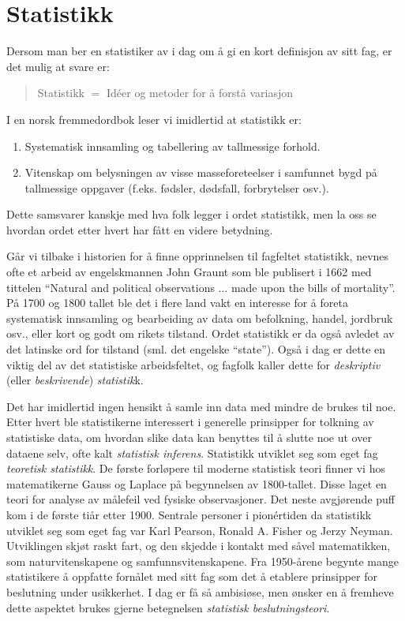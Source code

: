 \section{Statistikk}

Dersom man ber en statistiker av i dag om å gi en kort definisjon
av sitt fag, er det mulig at svare er:

\begin{quote}
Statistikk $=$ Id\'{e}er og metoder for å forstå variasjon
\end{quote}

\noindent I en norsk fremmedordbok leser vi imidlertid at
statistikk er:

\begin{enumerate}
\item Systematisk innsamling og tabellering av tallmessige forhold.
\item Vitenskap om belysningen av visse masseforeteelser i
     samfunnet bygd på tallmessige oppgaver (f.eks. fødsler,
     dødsfall, forbrytelser osv.).
\end{enumerate}

\noindent Dette samsvarer kanskje med hva folk legger i ordet
statistikk, men la oss se hvordan ordet etter hvert har fått en
 videre betydning.
                                 
Går vi tilbake i historien for å finne opprinnelsen til fagfeltet
statistikk, nevnes ofte et arbeid av engelskmannen John Graunt
som ble publisert i 1662 med tittelen ``Natural and political
observations ... made upon the bills of mortality''.  På 1700 og
1800 tallet ble det i flere land vakt en interesse for å foreta
systematisk innsamling og bearbeiding av data om befolkning,
handel, jordbruk osv., eller kort og godt om rikets tilstand. 
Ordet statistikk er da også avledet av det latinske ord for
tilstand (sml. det engelske ``state'').  Også i dag er dette en
viktig del av det statistiske arbeids\-feltet, og fagfolk kaller
dette for {\em deskriptiv} (eller {\em beskrivende}) {\em statistik}k.

Det har imidlertid ingen hensikt å samle inn data med mindre de
brukes til noe.  Etter hvert ble statistikerne interessert i
generelle prinsipper for tolkning av statistiske data, om hvordan
slike data kan benyttes til å slutte noe ut over dataene selv, 
ofte kalt {\em statistisk inferens}. 
Statistikk utviklet seg som eget fag {\em teoretisk statistikk}. 
De første forløpere til
moderne statistisk teori finner vi hos matematikerne Gauss og
Laplace på begynnelsen av 1800-tallet.  Disse laget en teori for
analyse av målefeil ved fysiske observasjoner.  Det neste
avgjørende puff kom i de første tiår etter 1900. Sentrale personer i
pion\'{e}rtiden  da statistikk utviklet seg som eget fag var Karl Pearson,
Ronald A. Fisher og Jerzy Neyman.  Utviklingen
skjøt raskt fart, og den skjedde i kontakt med såvel matematikken,
som naturvitenskapene og samfunnsvitenskapene.  Fra 1950-årene 
begynte mange statistikere å oppfatte fornålet med sitt fag som det 
å etablere prinsipper for beslutning under usikkerhet. I dag er få
så ambisiøse, men ønsker en å fremheve dette aspektet brukes gjerne 
betegnelsen {\em statistisk beslutningsteori}.

